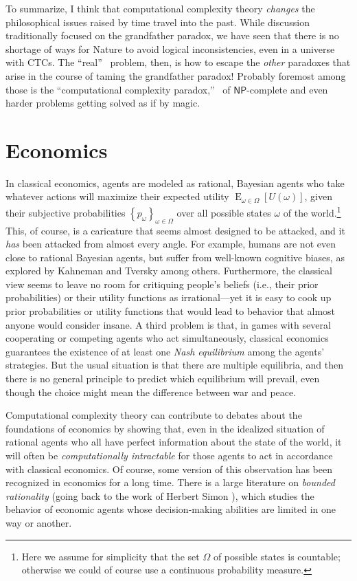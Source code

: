 \documentclass[12pt,onecolumn]{article}%
\begin{document}
To summarize, I think that computational complexity theory \textit{changes}
the philosophical issues raised by time travel into the past. While
discussion traditionally focused on the grandfather paradox, we have seen that
there is no shortage of ways for Nature to avoid logical inconsistencies, even
in a universe with CTCs. The \textquotedblleft real\textquotedblright\ %
 problem, then, is how to escape the \textit{other} paradoxes that arise in
the course of taming the grandfather paradox! Probably foremost among those
is the \textquotedblleft computational complexity paradox,\textquotedblright\ %
 of $\mathsf{NP}$-complete and even harder problems getting solved as if by magic.

\section{Economics\label{ECON}}

In classical economics, agents are modeled as rational, Bayesian agents who
take whatever actions will maximize their expected utility $\operatorname*{E}%
_{\omega\in\Omega}\left[  U(  \omega)  \right]  $, given their
subjective probabilities $\left\{  p_{\omega}\right\}  _{\omega\in\Omega}%
$ over all possible states $\omega$ of the world.\footnote{Here we assume
for simplicity that the set $\Omega$ of possible states is countable;
otherwise we could of course use a continuous probability measure.} This, of
course, is a caricature that seems almost designed to be attacked, and it
\textit{has} been attacked from almost every angle. For example, humans are
not even close to rational Bayesian agents, but suffer from well-known
cognitive biases, as explored by Kahneman and Tversky \cite{kahnemantversky}%
 among others. Furthermore, the classical view seems to leave no room for
critiquing people's beliefs (i.e., their prior probabilities) or their utility
functions as irrational---yet it is easy to cook up prior probabilities or
utility functions that would lead to behavior that almost anyone would
consider insane. A third problem is that, in games with several cooperating
or competing agents who act simultaneously, classical economics guarantees the
existence of at least one \textit{Nash equilibrium} among the agents'
strategies. But the usual situation is that there are multiple equilibria,
and then there is no general principle to predict which equilibrium will
prevail, even though the choice might mean the difference between war and peace.

Computational complexity theory can contribute to debates about the
foundations of economics by showing that, even in the idealized situation of
rational agents who all have perfect information about the state of the world,
it will often be \textit{computationally intractable} for those agents to act
in accordance with classical economics. Of course, some version of this
observation has been recognized in economics for a long time. There is a
large literature on \textit{bounded rationality} (going back to the work of
Herbert Simon \cite{herbsimon}), which studies the behavior of economic agents
whose decision-making abilities are limited in one way or another.
\end{document}
